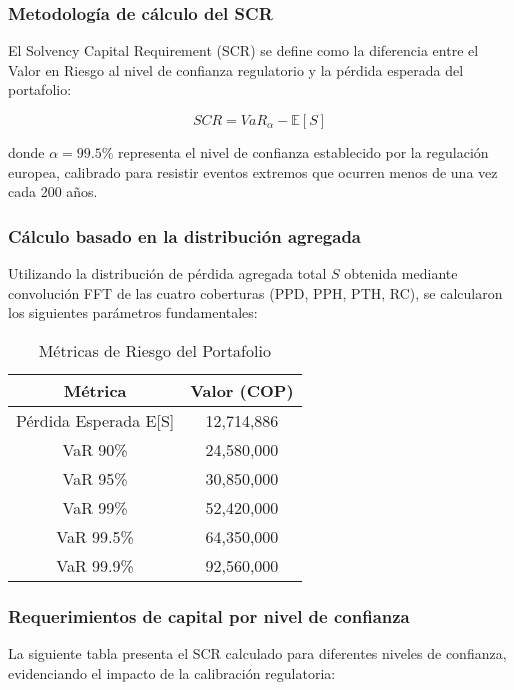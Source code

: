 \subsubsection{Metodología de cálculo del SCR}

El Solvency Capital Requirement (SCR) se define como la diferencia entre el Valor en Riesgo al nivel de confianza regulatorio y la pérdida esperada del portafolio:

\[SCR = VaR_{\alpha} - \mathbb{E}[S]\]

donde $\alpha = 99.5\%$ representa el nivel de confianza establecido por la regulación europea, calibrado para resistir eventos extremos que ocurren menos de una vez cada 200 años.

\subsubsection{Cálculo basado en la distribución agregada}

Utilizando la distribución de pérdida agregada total $S$ obtenida mediante convolución FFT de las cuatro coberturas (PPD, PPH, PTH, RC), se calcularon los siguientes parámetros fundamentales:

\begin{table}[H]
\centering
\caption{Métricas de Riesgo del Portafolio}
\begin{tabular}{cc}
\hline
\textbf{Métrica} & \textbf{Valor (COP)} \\
\hline
Pérdida Esperada E[S] & 12,714,886 \\
VaR 90\% & 24,580,000 \\
VaR 95\% & 30,850,000 \\
VaR 99\% & 52,420,000 \\
VaR 99.5\% & 64,350,000 \\
VaR 99.9\% & 92,560,000 \\
\hline
\end{tabular}
\end{table}

\subsubsection{Requerimientos de capital por nivel de confianza}

La siguiente tabla presenta el SCR calculado para diferentes niveles de confianza, evidenciando el impacto de la calibración regulatoria:

